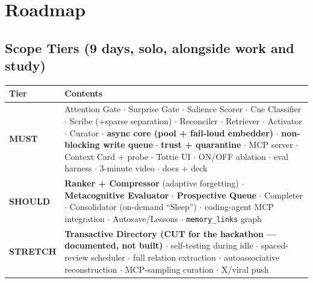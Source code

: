 \chapter{Roadmap}

\section{Scope Tiers (9 days, solo, alongside work and study)}
\begin{longtable}{@{}p{}p{}@{}}
\toprule
Tier & Contents \\
\midrule
\textbf{MUST} & Attention Gate $\cdot$ Surprise Gate $\cdot$ Salience Scorer $\cdot$ Cue Classifier $\cdot$ Scribe (+sparse separation) $\cdot$ Reconciler $\cdot$ Retriever $\cdot$ Activator $\cdot$ Curator $\cdot$ \textbf{async core (pool + fail-loud embedder)} $\cdot$ \textbf{non-blocking write queue} $\cdot$ \textbf{trust + quarantine} $\cdot$ MCP server $\cdot$ Context Card + probe $\cdot$ Tottie UI $\cdot$ ON/OFF ablation $\cdot$ eval harness $\cdot$ 3-minute video $\cdot$ docs + deck \\
\textbf{SHOULD} & \textbf{Ranker + Compressor} (adaptive forgetting) $\cdot$ \textbf{Metacognitive Evaluator} $\cdot$ \textbf{Prospective Queue} $\cdot$ Completer $\cdot$ Consolidator (on-demand ``Sleep'') $\cdot$ coding-agent MCP integration $\cdot$ Autosave/Lessons $\cdot$ \texttt{memory\_links} graph \\
\textbf{STRETCH} & \textbf{Transactive Directory (CUT for the hackathon --- documented, not built)} $\cdot$ self-testing during idle $\cdot$ spaced-review scheduler $\cdot$ full relation extraction $\cdot$ autoassociative reconstruction $\cdot$ MCP-sampling curation $\cdot$ X/viral push \\
\bottomrule
\end{longtable}

